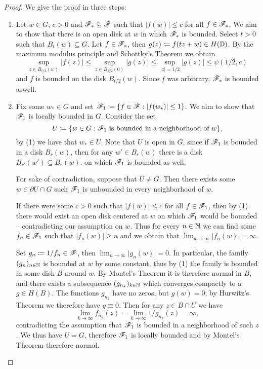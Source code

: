 \begin{proof}
    We give the proof in three steps:
    \begin{enumerate}
        \item Let $w \in G$, $c > 0$ and $\mathscr{F}_* \subseteq \mathscr{F}$ such that $\vert f(w) \vert \leq c$ for all $f \in \mathscr{F}_*$. We aim to show that there is an open disk at $w$ in which $\mathscr{F}_*$ is bounded. Select $t > 0$ such that $B_t(w) \subseteq G$. Let $f \in \mathscr{F}_*$, then $g(z) \coloneqq f(tz + w) \in H(\mathbb{D})$. By the maximum modulus principle and Schottky's Theorem we obtain
        $$ \sup_{z \in B_{t/2}(w)} \vert f(z) \vert \leq \sup_{z \in B_{1/2}(0)} \vert g(z) \vert \leq \sup_{\vert z \vert = 1/2} \vert g(z) \vert \leq \psi(1/2, c) $$
        and $f$ is bounded on the disk $B_{t/2}(w)$. Since $f$ was arbitrary, $\mathscr{F}_*$ is bounded aswell.

        \item Fix some $w_* \in G$ and set $\mathscr{F}_1 \coloneqq \{ f \in \mathscr{F} : \vert f(w_*) \vert \leq 1 \}$. We aim to show that $\mathscr{F}_1$ is locally bounded in $G$. Consider the set
        $$ U \coloneqq \{ w \in G : \mathscr{F}_1 \textrm{ is bounded in a neighborhood of } w \}, $$
        by (1) we have that $w_* \in U$. Note that $U$ is open in $G$, since if $\mathscr{F}_1$ is bounded in a disk $B_r(w)$, then for any $w' \in B_r(w)$ there is a disk $B_{r'}(w') \subseteq B_r(w)$, on which $\mathscr{F}_1$ is bounded as well.
        
        For sake of contradiction, suppose that $U \neq G$. Then there exists some $w \in \partial U \cap G$ such $\mathscr{F}_1$ is unbounded in every neighborhood of $w$.

        If there were some $c > 0$ such that $\vert f(w) \vert \leq c$ for all $f \in \mathscr{F}_1$, then by (1) there would exist an open disk centered at $w$ on which $\mathscr{F}_1$ would be bounded -- contradicting our assumption on $w$. Thus for every $n \in \mathbb{N}$ we can find some $f_n \in \mathscr{F}_1$ such that $\vert f_n(w) \vert \geq n$ and we obtain that $\lim_{n \to \infty} \vert f_n(w) \vert = \infty$.
        
        Set $g_n \coloneqq 1 / f_n \in \mathscr{F}$, then $\lim_{n \to \infty} \vert g_n(w) \vert = 0$. In particular, the family $(g_n)_{n \in \mathbb{N}}$ is bounded at $w$ by some constant, thus by (1) the family is bounded in some disk $B$ around $w$. By Montel's Theorem it is therefore normal in $B$, and there exists a subsequence $(g_{n_k})_{k \in \mathbb{N}}$ which converges compactly to a $g \in H(B)$. The functions $g_{n_k}$ have no zeros, but $g(w) = 0$; by Hurwitz's Theorem we therefore have $g \equiv 0$. Then for any $z \in B \cap U$ we have
        $$ \lim_{k \to \infty} f_{n_k}(z) = \lim_{k \to \infty} 1 / g_{n_k}(z) = \infty, $$
        contradicting the assumption that $\mathscr{F}_1$ is bounded in a neighborhood of such $z$. We thus have $U = G$, therefore $\mathscr{F}_1$ is locally bounded and by Montel's Theorem therefore normal.


\end{enumerate}
\end{proof}
